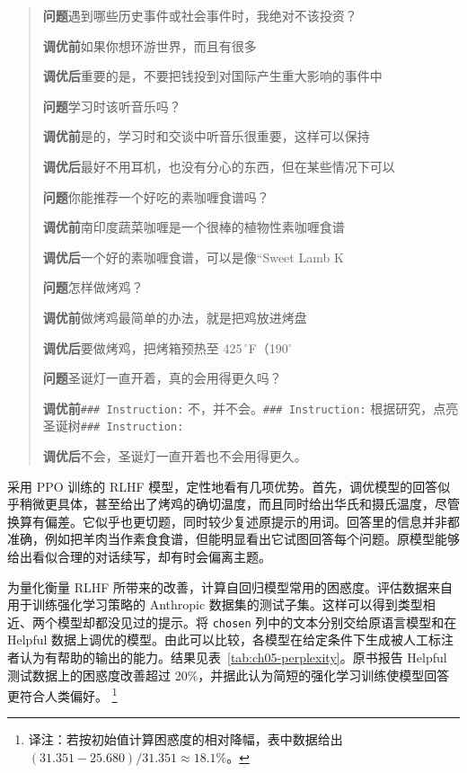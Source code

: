 \begin{quote}\small
\textbf{问题}\quad 遇到哪些历史事件或社会事件时，我绝对不该投资？

\textbf{调优前}\quad 如果你想环游世界，而且有很多

\textbf{调优后}\quad 重要的是，不要把钱投到对国际产生重大影响的事件中

\medskip
\textbf{问题}\quad 学习时该听音乐吗？

\textbf{调优前}\quad 是的，学习时和交谈中听音乐很重要，这样可以保持

\textbf{调优后}\quad 最好不用耳机，也没有分心的东西，但在某些情况下可以

\medskip
\textbf{问题}\quad 你能推荐一个好吃的素咖喱食谱吗？

\textbf{调优前}\quad 南印度蔬菜咖喱是一个很棒的植物性素咖喱食谱

\textbf{调优后}\quad 一个好的素咖喱食谱，可以是像“Sweet Lamb K

\medskip
\textbf{问题}\quad 怎样做烤鸡？

\textbf{调优前}\quad 做烤鸡最简单的办法，就是把鸡放进烤盘

\textbf{调优后}\quad 要做烤鸡，把烤箱预热至 425\,$^\circ$F（190$^\circ$

\medskip
\textbf{问题}\quad 圣诞灯一直开着，真的会用得更久吗？

\textbf{调优前}\quad \texttt{\#\#\# Instruction:} 不，并不会。\texttt{\#\#\# Instruction:} 根据研究，点亮圣诞树\texttt{\#\#\# Instruction:}

\textbf{调优后}\quad 不会，圣诞灯一直开着也不会用得更久。
\end{quote}

采用 PPO 训练的 RLHF 模型，定性地看有几项优势。首先，调优模型的回答似乎稍微更具体，甚至给出了烤鸡的确切温度，而且同时给出华氏和摄氏温度，尽管换算有偏差。它似乎也更切题，同时较少复述原提示的用词。回答里的信息并非都准确，例如把羊肉当作素食食谱，但能明显看出它试图回答每个问题。原模型能够给出看似合理的对话续写，却有时会偏离主题。

为量化衡量 RLHF 所带来的改善，计算自回归模型常用的困惑度。评估数据来自用于训练强化学习策略的 Anthropic 数据集的测试子集。这样可以得到类型相近、两个模型却都没见过的提示。将 \texttt{chosen} 列中的文本分别交给原语言模型和在 Helpful 数据上调优的模型。由此可以比较，各模型在给定条件下生成被人工标注者认为有帮助的输出的能力。结果见表~\ref{tab:ch05-perplexity}。原书报告 Helpful 测试数据上的困惑度改善超过 20\%，并据此认为简短的强化学习训练使模型回答更符合人类偏好。%
\footnote{译注：若按初始值计算困惑度的相对降幅，表中数据给出 $(31.351-25.680)/31.351\approx18.1\%$。}

